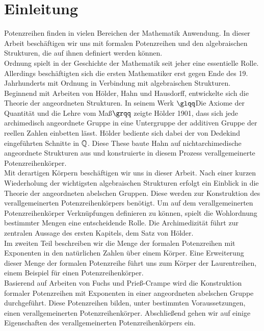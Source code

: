 \chapter{Einleitung}
%
Potenzreihen finden in vielen Bereichen der Mathematik Anwendung. In dieser Arbeit beschäftigen wir uns mit formalen Potenzreihen und den algebraischen Strukturen, die auf ihnen definiert werden können. \\
Ordnung spielt  in der Geschichte der Mathematik seit jeher eine essentielle Rolle. Allerdings beschäftigten sich die ersten Mathematiker erst gegen Ende des 19. Jahrhunderts mit Ordnung in Verbindung mit algebraischen Strukturen. Beginnend mit Arbeiten von Hölder, Hahn und Hausdorff, entwickelte sich die Theorie der angeordneten Strukturen. In seinem Werk $\glqq$Die Axiome der Quantität und die Lehre vom Maß$\grqq$ zeigte Hölder 1901, dass sich jede archimedisch angeordnete Gruppe in eine Untergruppe der additiven Gruppe der reellen Zahlen einbetten lässt. Hölder bediente sich dabei der von Dedekind eingeführten Schnitte in $\mathbb{Q}$. Diese These baute Hahn auf nichtarchimedische angeordnete Strukturen aus und konstruierte in diesem Prozess verallgemeinerte Potenzreihenkörper.    \\
Mit derartigen Körpern beschäftigen wir uns in dieser Arbeit. Nach einer kurzen Wiederholung der wichtigsten algebraischen Strukturen erfolgt ein Einblick in die Theorie der angeordneten abelschen Gruppen. Diese werden zur Konstruktion des verallgemeinerten Potenzreihenkörpers benötigt. Um auf dem verallgemeinerten Potenzreihenkörper Verknüpfungen definieren zu können, spielt die Wohlordnung bestimmter Mengen eine entscheidende Rolle. Die Archimedizität führt zur zentralen Aussage des ersten Kapitels, dem Satz von Hölder. \\
Im zweiten Teil beschreiben wir die Menge der formalen Potenzreihen mit Exponenten in den natürlichen Zahlen über einem Körper. Eine Erweiterung dieser Menge der formalen Potenzreihe führt uns zum Körper der Laurentreihen, einem Beispiel für einen Potenzreihenkörper.\\
Basierend auf Arbeiten von Fuchs und Prieß-Crampe wird die Konstruktion formaler Potenzreihen mit Exponenten in einer angeordneten abelschen Gruppe durchgeführt. Diese Potenzreihen bilden, unter bestimmten Voraussetzungen, einen verallgemeinerten Potenzreihenkörper. Abschließend gehen wir auf einige Eigenschaften des verallgemeinerten Potenzreihenkörpers ein. 




%
%
%
